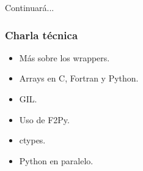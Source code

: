 \documentclass{beamer}
\begin{document}
\begin{frame}
\begin{center}
 \begin{Huge}
  Continuará...
 \end{Huge}
\end{center}
\end{frame}

\begin{frame}
 \frametitle{Charla técnica}
\begin{itemize}
 \item Más sobre los wrappers.
 \item Arrays en C, Fortran y Python.
 \item GIL.
 \item Uso de F2Py.
 \item ctypes.
 \item Python en paralelo.
\end{itemize}

\end{frame}
\end{document}
